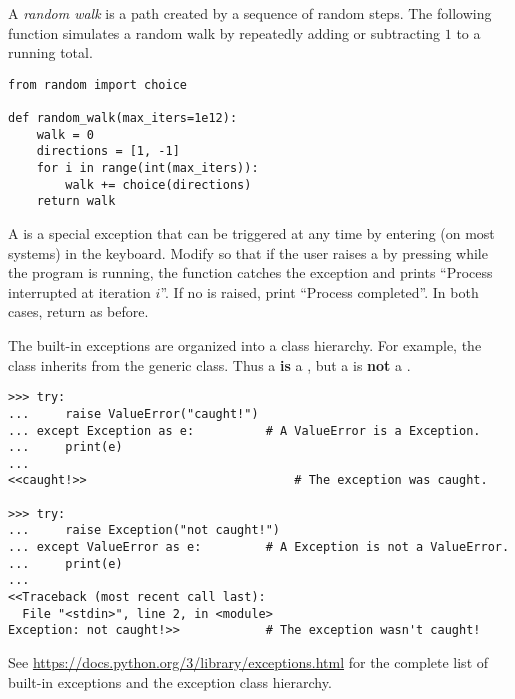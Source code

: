 \begin{problem} %
A \emph{random walk} is a path created by a sequence of random steps.
The following function simulates a random walk by repeatedly adding or subtracting $1$ to a running total.

\begin{lstlisting}
from random import choice

def random_walk(max_iters=1e12):
    walk = 0
    directions = [1, -1]
    for i in range(int(max_iters)):
        walk += choice(directions)
    return walk
\end{lstlisting}

A  is a special exception that can be triggered at any time by entering  (on most systems) in the keyboard.
Modify  so that if the user raises a  by pressing  while the program is running, the function catches the exception and prints ``Process interrupted at iteration $i$''.
If no  is raised, print ``Process completed''.
In both cases, return  as before.
\end{problem}

\begin{info} %
The built-in exceptions are organized into a class hierarchy.
For example, the  class inherits from the generic  class.
Thus a  \textbf{is} a , but a  is \textbf{not} a .

\begin{lstlisting}
>>> try:
...     raise ValueError("caught!")
... except Exception as e:          # A ValueError is a Exception.
...     print(e)
...
<<caught!>>                             # The exception was caught.

>>> try:
...     raise Exception("not caught!")
... except ValueError as e:         # A Exception is not a ValueError.
...     print(e)
...
<<Traceback (most recent call last):
  File "<stdin>", line 2, in <module>
Exception: not caught!>>            # The exception wasn't caught!
\end{lstlisting}

See \url{https://docs.python.org/3/library/exceptions.html} for the complete list of built-in exceptions and the exception class hierarchy.
\end{info}

